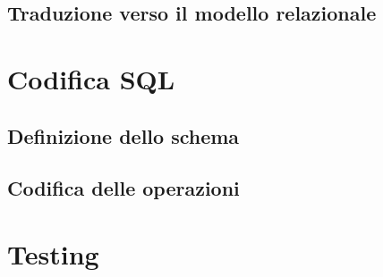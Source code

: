 \documentclass{article}
\begin{document}
\subsection{Traduzione verso il modello relazionale}

\section{Codifica SQL}

\subsection{Definizione dello schema}

\subsection{Codifica delle operazioni}

\section{Testing}
\end{document}
